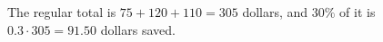 The regular total is $75+120+110=305$ dollars, and $30\%$ of it is $0.3\cdot305=\boxed{91.50}$ dollars saved.
